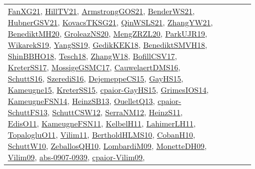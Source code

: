 {\begin{longtable}{lp{3cm}>{\raggedright}p{6cm}>{\raggedright}p{6cm}p{8cm}}
\href{articles/FanXG21.pdf}{FanXG21}\cite{FanXG21}, \href{papers/HillTV21.pdf}{HillTV21}\cite{HillTV21}, \href{papers/ArmstrongGOS21.pdf}{ArmstrongGOS21}\cite{ArmstrongGOS21}, \href{papers/BenderWS21.pdf}{BenderWS21}\cite{BenderWS21}, \href{articles/HubnerGSV21.pdf}{HubnerGSV21}\cite{HubnerGSV21}, \href{papers/KovacsTKSG21.pdf}{KovacsTKSG21}\cite{KovacsTKSG21}, \href{articles/QinWSLS21.pdf}{QinWSLS21}\cite{QinWSLS21}, \href{articles/ZhangYW21.pdf}{ZhangYW21}\cite{ZhangYW21}, \href{articles/BenediktMH20.pdf}{BenediktMH20}\cite{BenediktMH20}, \href{papers/GroleazNS20.pdf}{GroleazNS20}\cite{GroleazNS20}, \href{articles/MengZRZL20.pdf}{MengZRZL20}\cite{MengZRZL20}, \href{papers/ParkUJR19.pdf}{ParkUJR19}\cite{ParkUJR19}, \href{articles/WikarekS19.pdf}{WikarekS19}\cite{WikarekS19}, \href{papers/YangSS19.pdf}{YangSS19}\cite{YangSS19}, \href{articles/GedikKEK18.pdf}{GedikKEK18}\cite{GedikKEK18}, \href{papers/BenediktSMVH18.pdf}{BenediktSMVH18}\cite{BenediktSMVH18}, \href{articles/ShinBBHO18.pdf}{ShinBBHO18}\cite{ShinBBHO18}, \href{papers/Tesch18.pdf}{Tesch18}\cite{Tesch18}, \href{articles/ZhangW18.pdf}{ZhangW18}\cite{ZhangW18}, \href{papers/BofillCSV17.pdf}{BofillCSV17}\cite{BofillCSV17}, \href{articles/KreterSS17.pdf}{KreterSS17}\cite{KreterSS17}, \href{papers/MossigeGSMC17.pdf}{MossigeGSMC17}\cite{MossigeGSMC17}, \href{papers/CauwelaertDMS16.pdf}{CauwelaertDMS16}\cite{CauwelaertDMS16}, \href{papers/SchuttS16.pdf}{SchuttS16}\cite{SchuttS16}, \href{papers/SzerediS16.pdf}{SzerediS16}\cite{SzerediS16}, \href{papers/DejemeppeCS15.pdf}{DejemeppeCS15}\cite{DejemeppeCS15}, \href{papers/GayHS15.pdf}{GayHS15}\cite{GayHS15}, \href{articles/Kameugne15.pdf}{Kameugne15}\cite{Kameugne15}, \href{papers/KreterSS15.pdf}{KreterSS15}\cite{KreterSS15}, \href{papers/cpaior-GayHS15.pdf}{cpaior-GayHS15}\cite{cpaior-GayHS15}, \href{articles/GrimesIOS14.pdf}{GrimesIOS14}\cite{GrimesIOS14}, \href{articles/KameugneFSN14.pdf}{KameugneFSN14}\cite{KameugneFSN14}, \href{articles/HeinzSB13.pdf}{HeinzSB13}\cite{HeinzSB13}, \href{papers/OuelletQ13.pdf}{OuelletQ13}\cite{OuelletQ13}, \href{papers/cpaior-SchuttFS13.pdf}{cpaior-SchuttFS13}\cite{cpaior-SchuttFS13}, \href{papers/SchuttCSW12.pdf}{SchuttCSW12}\cite{SchuttCSW12}, \href{papers/SerraNM12.pdf}{SerraNM12}\cite{SerraNM12}, \href{papers/HeinzS11.pdf}{HeinzS11}\cite{HeinzS11}, \href{papers/EdisO11.pdf}{EdisO11}\cite{EdisO11}, \href{papers/KameugneFSN11.pdf}{KameugneFSN11}\cite{KameugneFSN11}, \href{articles/KelbelH11.pdf}{KelbelH11}\cite{KelbelH11}, \href{papers/LahimerLH11.pdf}{LahimerLH11}\cite{LahimerLH11}, \href{articles/TopalogluO11.pdf}{TopalogluO11}\cite{TopalogluO11}, \href{papers/Vilim11.pdf}{Vilim11}\cite{Vilim11}, \href{papers/BertholdHLMS10.pdf}{BertholdHLMS10}\cite{BertholdHLMS10}, \href{papers/CobanH10.pdf}{CobanH10}\cite{CobanH10}, \href{papers/SchuttW10.pdf}{SchuttW10}\cite{SchuttW10}, \href{articles/ZeballosQH10.pdf}{ZeballosQH10}\cite{ZeballosQH10}, \href{papers/LombardiM09.pdf}{LombardiM09}\cite{LombardiM09}, \href{papers/MonetteDH09.pdf}{MonetteDH09}\cite{MonetteDH09}, \href{papers/Vilim09.pdf}{Vilim09}\cite{Vilim09}, \href{articles/abs-0907-0939.pdf}{abs-0907-0939}\cite{abs-0907-0939}, \href{papers/cpaior-Vilim09.pdf}{cpaior-Vilim09}\cite{cpaior-Vilim09}, 
\end{longtable}}
